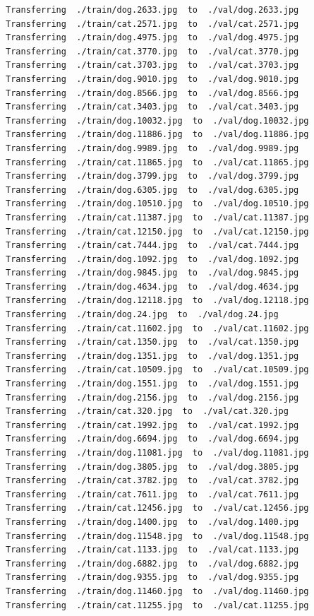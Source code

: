 \documentclass[]{book}
\theoremstyle{definition}
\theoremstyle{definition}
\theoremstyle{definition}
\theoremstyle{remark}
\begin{document}
\begin{verbatim}
Transferring  ./train/dog.2633.jpg  to  ./val/dog.2633.jpg
Transferring  ./train/cat.2571.jpg  to  ./val/cat.2571.jpg
Transferring  ./train/dog.4975.jpg  to  ./val/dog.4975.jpg
Transferring  ./train/cat.3770.jpg  to  ./val/cat.3770.jpg
Transferring  ./train/cat.3703.jpg  to  ./val/cat.3703.jpg
Transferring  ./train/dog.9010.jpg  to  ./val/dog.9010.jpg
Transferring  ./train/dog.8566.jpg  to  ./val/dog.8566.jpg
Transferring  ./train/cat.3403.jpg  to  ./val/cat.3403.jpg
Transferring  ./train/dog.10032.jpg  to  ./val/dog.10032.jpg
Transferring  ./train/dog.11886.jpg  to  ./val/dog.11886.jpg
Transferring  ./train/dog.9989.jpg  to  ./val/dog.9989.jpg
Transferring  ./train/cat.11865.jpg  to  ./val/cat.11865.jpg
Transferring  ./train/dog.3799.jpg  to  ./val/dog.3799.jpg
Transferring  ./train/dog.6305.jpg  to  ./val/dog.6305.jpg
Transferring  ./train/dog.10510.jpg  to  ./val/dog.10510.jpg
Transferring  ./train/cat.11387.jpg  to  ./val/cat.11387.jpg
Transferring  ./train/cat.12150.jpg  to  ./val/cat.12150.jpg
Transferring  ./train/cat.7444.jpg  to  ./val/cat.7444.jpg
Transferring  ./train/dog.1092.jpg  to  ./val/dog.1092.jpg
Transferring  ./train/dog.9845.jpg  to  ./val/dog.9845.jpg
Transferring  ./train/dog.4634.jpg  to  ./val/dog.4634.jpg
Transferring  ./train/dog.12118.jpg  to  ./val/dog.12118.jpg
Transferring  ./train/dog.24.jpg  to  ./val/dog.24.jpg
Transferring  ./train/cat.11602.jpg  to  ./val/cat.11602.jpg
Transferring  ./train/cat.1350.jpg  to  ./val/cat.1350.jpg
Transferring  ./train/dog.1351.jpg  to  ./val/dog.1351.jpg
Transferring  ./train/cat.10509.jpg  to  ./val/cat.10509.jpg
Transferring  ./train/dog.1551.jpg  to  ./val/dog.1551.jpg
Transferring  ./train/dog.2156.jpg  to  ./val/dog.2156.jpg
Transferring  ./train/cat.320.jpg  to  ./val/cat.320.jpg
Transferring  ./train/cat.1992.jpg  to  ./val/cat.1992.jpg
Transferring  ./train/dog.6694.jpg  to  ./val/dog.6694.jpg
Transferring  ./train/dog.11081.jpg  to  ./val/dog.11081.jpg
Transferring  ./train/dog.3805.jpg  to  ./val/dog.3805.jpg
Transferring  ./train/cat.3782.jpg  to  ./val/cat.3782.jpg
Transferring  ./train/cat.7611.jpg  to  ./val/cat.7611.jpg
Transferring  ./train/cat.12456.jpg  to  ./val/cat.12456.jpg
Transferring  ./train/dog.1400.jpg  to  ./val/dog.1400.jpg
Transferring  ./train/dog.11548.jpg  to  ./val/dog.11548.jpg
Transferring  ./train/cat.1133.jpg  to  ./val/cat.1133.jpg
Transferring  ./train/dog.6882.jpg  to  ./val/dog.6882.jpg
Transferring  ./train/dog.9355.jpg  to  ./val/dog.9355.jpg
Transferring  ./train/dog.11460.jpg  to  ./val/dog.11460.jpg
Transferring  ./train/cat.11255.jpg  to  ./val/cat.11255.jpg

\end{verbatim}
\end{document}
